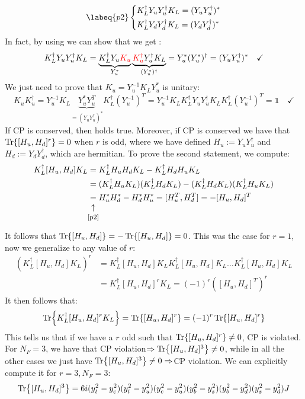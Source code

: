 \documentclass[../main.tex]{subfiles}
\begin{document}
\begin{equation}
\labeq{p2}
\left\{
\begin{aligned}
&K_L^\dagger Y_uY_u^\dagger K_L=(Y_uY_u^\dagger)^*\\
&K_L^\dagger Y_dY_d^\dagger K_L=(Y_dY_d^\dagger)^*
\end{aligned}
\right.
\end{equation}
In fact, by using  we can show that we get :
\[
K_L^\dagger Y_uY_u^\dagger K_L=\underbrace{K_L^\dagger Y_u{\color{red}K_u}}_{Y_u^*}\underbrace{{\color{red}K_u^\dagger}Y_u^\dagger K_L}_{(Y_u^*)^\dagger}=Y_u^*(Y_u^*)^\dagger=(Y_uY_u^\dagger)^* \quad \checkmark
\]
We just need to prove that $K_u=Y_u^{-1}K_LY_u^*$ is unitary:
\[
K_uK_u^\dagger=Y_u^{-1}K_L\underbrace{Y_u^*Y_u^T}_{=(Y_uY_u^\dagger)^*}K_L^\dagger(Y_u^{-1})^T=Y_u^{-1}K_LK_L^\dagger Y_uY_u^\dagger K_LK_L^\dagger(Y_u^{-1})^T=\mathbb{1} \quad \checkmark
\]
If CP is conserved, then  holds true. Moreover, if CP is conserved we have that $\Tr{[H_u,H_d]^r}=0$ when $r$ is odd, where we have defined $H_u:=Y_uY_u^\dagger$ and $H_d:=Y_dY_d^\dagger$, which are hermitian. To prove the second statement, we compute:
\begin{align*}
K_L^\dagger[H_u,H_d]K_L&=K_L^\dagger H_uH_dK_L-K_L^\dagger H_dH_uK_L\\
&=(K_L^\dagger H_uK_L)(K_L^\dagger H_dK_L)-(K_L^\dagger H_dK_L)(K_L^\dagger H_uK_L)\\
&\underset{\mathclap{\tikz \node {$\uparrow$} node [below=1ex] {\footnotesize \refeq{p2} };}}{=}H_u^*H_d^*-H_d^*H_u^*=[H_u^T,H_d^T]=-[H_u,H_d]^T
\end{align*}
It follows that $\Tr{[H_u,H_d]}=-\Tr{[H_u,H_d]}=0$. This was the case for $r=1$, now we generalize to any value of $r$:
\begin{align*}
\left(K_L^\dagger[H_u,H_d]K_L\right)^r&=K_L^\dagger[H_u,H_d]K_LK_L^\dagger[H_u,H_d]K_L\dots K_L^\dagger[H_u,H_d]K_L\\
&=K_L^\dagger[H_u,H_d]^rK_L=(-1)^r\left([H_u,H_d]^T\right)^r
\end{align*}
It then follows that: 
\[
\Tr{K_L^\dagger[H_u,H_d]^rK_L}=\Tr{[H_u,H_d]^r}=(-1)^r\Tr{[H_u,H_d]^r}
\]
This tells us that if we have a $r$ odd such that $\Tr{[H_u,H_d]^r}\neq0$, CP is violated. For $N_F=3$, we have that CP violation$\Rightarrow\Tr{[H_u,H_d]^3}\neq0$, while in all the other cases we just have $\Tr{[H_u,H_d]^3}\neq0\Rightarrow$CP violation. We can explicitly compute it for $r=3, N_F=3$:
\[
\Tr{[H_u,H_d]^3}=6i(y_t^2-y_c^2)(y_t^2-y_u^2)(y_c^2-y_u^2)(y_b^2-y_s^2)(y_b^2-y_d^2)(y_s^2-y_d^2)J
\]
\end{document}
